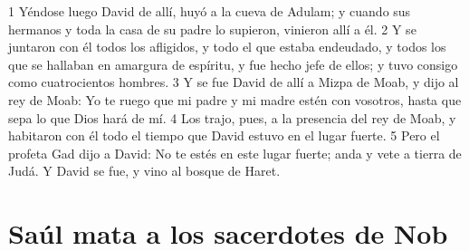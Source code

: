 1 Yéndose luego David de allí, huyó a la cueva de Adulam; y cuando sus hermanos y toda la casa de su padre lo supieron, vinieron allí a él.
2 Y se juntaron con él todos los afligidos, y todo el que estaba endeudado, y todos los que se hallaban en amargura de espíritu, y fue hecho jefe de ellos; y tuvo consigo como cuatrocientos hombres.
3 Y se fue David de allí a Mizpa de Moab, y dijo al rey de Moab: Yo te ruego que mi padre y mi madre estén con vosotros, hasta que sepa lo que Dios hará de mí.
4 Los trajo, pues, a la presencia del rey de Moab, y habitaron con él todo el tiempo que David estuvo en el lugar fuerte.
5 Pero el profeta Gad dijo a David: No te estés en este lugar fuerte; anda y vete a tierra de Judá. Y David se fue, y vino al bosque de Haret.

\section*{Saúl mata a los sacerdotes de Nob}

